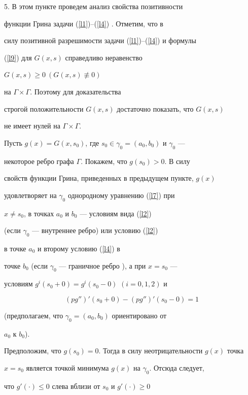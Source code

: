 {{{{{{{5. В этом пункте проведем анализ свойства позитивности


функции Грина задачи (\ref{l1})--(\ref{l4}) . Отметим, что в


силу позитивной разрешимости задачи (\ref{l1})--(\ref{l4}) и формулы


(\ref{l9}) для $G(x,s)$ справедливо неравенство 


$G(x,s)\geq 0\ (G(x,s)\not \equiv 0)$


на $\Gamma\times\Gamma$. Поэтому для доказательства


строгой положительности $G(x,s)$ достаточно показать, что $G(x,s)$


не имеет нулей на $\Gamma\times\Gamma$.





Пусть $g(x)=G(x,s_0)$, где $s_0 \in \gamma_0=(a_0,b_0)$ и $\gamma_0$ ---


некоторое ребро графа $\Gamma$. Покажем, что $g(s_0)>0$. В силу


свойств функции Грина, приведенных в предыдущем пункте, $g(x)$


удовлетворяет на $\gamma_0$ однородному уравнению (\ref{l7}) при


$x\ne s_0$, в точках $a_0$ и $b_0$ --- условиям вида (\ref{l2})


(если $\gamma_0$ --- внутреннее ребро) или условию (\ref{l2})


в точке $a_0$ и второму условию (\ref{l4}) в


точке $b_0$ (если $\gamma_0$ --- граничное ребро ), а при $x = s_0$ ---


условиям $g^i (s_0+0)=g^i(s_0-0)$ $(i=0,1,2)$ и


\begin{equation}


\label{l15}


(pg'')'(s_0+0)-(pg'')'(s_0 -0)=1


\end{equation}


(предполагаем, что $\gamma_{0}=(a_{0},b_{0})$ ориентировано от


$a_{0}$ к $b_{0}$).





Предположим, что $g(s_0)=0$. Тогда в силу неотрицательности $g(x)$ точка


$x=s_0$ является точкой минимума $g(x)$ на $\gamma_0$. Отсюда следует,


что $g'(\cdot)\leq 0$ слева вблизи от $s_0$ и $g'(\cdot)\geq 0$


}}}}}}}
